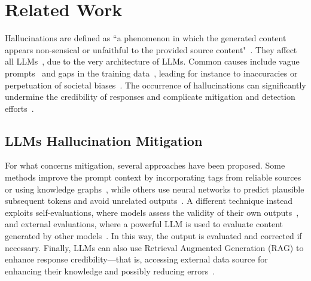 \section{Related Work}
\label{sec:relworks}
Hallucinations are defined as ``a phenomenon in which the generated content appears non-sensical or unfaithful to the provided source content"~\cite{filippova2020controlled, maynez2020faithfulness}. They affect all LLMs~\cite{huang2023survey}, due to the very architecture of LLMs. Common causes include vague prompts~\cite{ren2022out} and gaps in the training data~\cite{perkovic2024hallucinations}, leading for instance to inaccuracies or perpetuation of societal biases~\cite{ladhak2023pre, venkit2023nationality, giorgi2024human}. The occurrence of hallucinations can significantly undermine the credibility of responses and complicate mitigation and detection efforts~\cite{guerreiro2022looking, huang2025look}.

\subsection{LLMs Hallucination Mitigation} \label{sub:mitigation} 
For what concerns mitigation, several approaches have been proposed. Some methods improve the prompt context by incorporating tags from reliable sources~\cite{feldman2023trapping} or using knowledge graphs~\cite{martino2023knowledge}, while others use neural networks to predict plausible subsequent tokens and avoid unrelated outputs~\cite{verma2023reducing}. A different technique instead exploits self-evaluations, where models assess the validity of their own outputs~\cite{kadavath2022language, ji2023towards}, and external evaluations, where a powerful LLM is used to evaluate content generated by other models~\cite{hao2024quantifying}. In this way, the output is evaluated and corrected if necessary. Finally, LLMs can also use Retrieval Augmented Generation (RAG) to enhance response credibility---that is, accessing external data source for enhancing their knowledge and possibly reducing errors~\cite{fan2024survey,arslan2024survey}.

